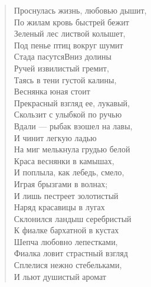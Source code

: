 \begin{verse}
\begin{altverse}
Проснулась жизнь, любовью дышит,\\
    По жилам кровь быстрей бежит\ldotst\\
Зеленый лес листвой колышет,\\
    Под пенье птиц вокруг шумит\ldotst\\
Стада пасутся\ldotst Вниз долины\\
    Ручей извилистый гремит,\\
Таясь в тени густой калины,\\
     Веснянка юная стоит\ldotst\\
Прекрасный взгляд ее, лукавый,\\
    Скользит с улыбкой по ручью\ldotst\\
Вдали --- рыбак взошел на лавы,\\
    И чинит легкую ладью\ldotst\\
На миг мелькнула грудью белой\\
    Краса веснянки в камышах,\\
И поплыла, как лебедь, смело,\\
    Играя брызгами в волнах;\\
И лишь пестреет золотистый\\
    Наряд красавицы в лугах\ldotst\\
Склонился ландыш серебристый\\
    К фиалке бархатной в кустах\ldotst\\
Шепча любовно лепестками,\\
    Фиалка ловит страстный взгляд\ldotst\\
Сплелися нежно стебельками,\\
    И льют душистый аромат\ldotst
\end{altverse}
\end{verse}

